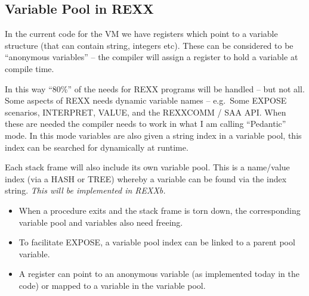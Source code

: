 \hypertarget{variable-pool-in-rexx}{%
\subsection{Variable Pool in REXX}\label{variable-pool-in-rexx}}

In the current code for the VM we have registers which point to a
variable structure (that can contain string, integers etc). These can be
considered to be ``anonymous variables'' -- the compiler will assign a
register to hold a variable at compile time.

In this way ``80\%'' of the needs for REXX programs will be handled --
but not all. Some aspects of REXX needs dynamic variable names --
e.g.~Some EXPOSE scenarios, INTERPRET, VALUE, and the REXXCOMM / SAA
API. When these are needed the compiler needs to work in what I am
calling ``Pedantic'' mode. In this mode variables are also given a
string index in a variable pool, this index can be searched for
dynamically at runtime.

Each stack frame will also include its own variable pool. This is a
name/value index (via a HASH or TREE) whereby a variable can be found
via the index string. \emph{This will be implemented in REXXb.}

\begin{itemize}
\tightlist
\item
  When a procedure exits and the stack frame is torn down, the
  corresponding variable pool and variables also need freeing.
\item
  To facilitate EXPOSE, a variable pool index can be linked to a parent
  pool variable.
\item
  A register can point to an anonymous variable (as implemented today in
  the code) or mapped to a variable in the variable pool.
\end{itemize}
